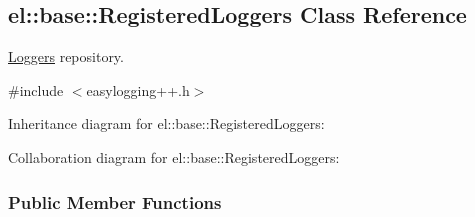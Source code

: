 \hypertarget{a00072}{}\subsection{el\+:\+:base\+:\+:Registered\+Loggers Class Reference}
\label{a00072}


\hyperlink{a00049}{Loggers} repository.  




{\ttfamily \#include $<$easylogging++.\+h$>$}



Inheritance diagram for el\+:\+:base\+:\+:Registered\+Loggers\+:


Collaboration diagram for el\+:\+:base\+:\+:Registered\+Loggers\+:
\subsubsection*{Public Member Functions}
